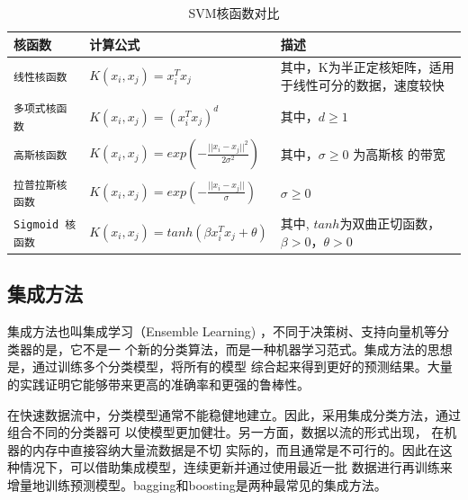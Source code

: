 \begin{table}[H]                                                                    \begin{singlespace}                                                          
    \centering\caption{SVM核函数对比}\label{tab:level}
    \renewcommand{\arraystretch}{1.5} %
    \begin{tabular}{llp{6cm}}\hline
      核函数 & 计算公式 & 描述 \\  \hline                                                
      \verb|线性核函数| & $K(x_i,x_j)=x_i^Tx_j$ & 其中，K为半正定核矩阵，适用于线性可分的数据，速度较快\\                                                   
      \verb|多项式核函数| & $K(x_i,x_j)=(x_i^Tx_j)^d$ &  其中，$d \geq 1$\\
      \verb|高斯核函数| & $K(x_i,x_j)=exp(-\frac{{||x_i-x_j||}^2}{2\sigma^2})$ & 其中，$\sigma
                                                                                 \geq 0$
                                                                                 为高斯核
                                                                                 的带宽 \\
      \verb|拉普拉斯核函数| & $K(x_i,x_j)=exp(-\frac{||x_i-x_j||}{\sigma})$ & $\sigma
                                                                                 \geq 0$ \\
      \verb|Sigmoid 核函数| &  $K(x_i,x_j)=tanh(\beta x_i^Tx_j+\theta)$ & 其中, $tanh$为双曲正切函数，$\beta>0$，$\theta>0$ \\            
      \hline                                                                  
\end{tabular}                                                              
\end{singlespace}
\end{table}

\subsection{集成方法}
集成方法也叫集成学习（Ensemble Learning) ，不同于决策树、支持向量机等分类器的是，它不是一
个新的分类算法，而是一种机器学习范式。集成方法的思想是，通过训练多个分类模型，将所有的模型
综合起来得到更好的预测结果。大量的实践证明它能够带来更高的准确率和更强的鲁棒性。

在快速数据流中，分类模型通常不能稳健地建立。因此，采用集成分类方法，通过组合不同的分类器可
以使模型更加健壮。另一方面，数据以流的形式出现， 在机器的内存中直接容纳大量流数据是不切
实际的，而且通常是不可行的。因此在这种情况下，可以借助集成模型，连续更新并通过使用最近一批
数据进行再训练来增量地训练预测模型。bagging和boosting是两种最常见的集成方法\cite{oza2005online}。

